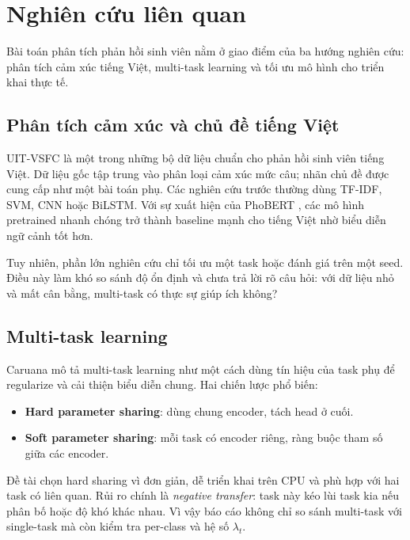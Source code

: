\documentclass[12pt,a4paper]{report}
\begin{document}
\section{Nghiên cứu liên quan}

Bài toán phân tích phản hồi sinh viên nằm ở giao điểm của ba hướng nghiên cứu: phân tích cảm xúc tiếng Việt, multi-task learning và tối ưu mô hình cho triển khai thực tế.

\subsection{Phân tích cảm xúc và chủ đề tiếng Việt}

UIT-VSFC \cite{uitvsfc} là một trong những bộ dữ liệu chuẩn cho phản hồi sinh viên tiếng Việt. Dữ liệu gốc tập trung vào phân loại cảm xúc mức câu; nhãn chủ đề được cung cấp như một bài toán phụ. Các nghiên cứu trước thường dùng TF-IDF, SVM, CNN hoặc BiLSTM. Với sự xuất hiện của PhoBERT \cite{phobert}, các mô hình pretrained nhanh chóng trở thành baseline mạnh cho tiếng Việt nhờ biểu diễn ngữ cảnh tốt hơn.

Tuy nhiên, phần lớn nghiên cứu chỉ tối ưu một task hoặc đánh giá trên một seed. Điều này làm khó so sánh độ ổn định và chưa trả lời rõ câu hỏi: với dữ liệu nhỏ và mất cân bằng, multi-task có thực sự giúp ích không?

\subsection{Multi-task learning}

Caruana \cite{mtl} mô tả multi-task learning như một cách dùng tín hiệu của task phụ để regularize và cải thiện biểu diễn chung. Hai chiến lược phổ biến:

\begin{itemize}[leftmargin=1.2cm]
  \item \textbf{Hard parameter sharing}: dùng chung encoder, tách head ở cuối.
  \item \textbf{Soft parameter sharing}: mỗi task có encoder riêng, ràng buộc tham số giữa các encoder.
\end{itemize}

Đề tài chọn hard sharing vì đơn giản, dễ triển khai trên CPU và phù hợp với hai task có liên quan. Rủi ro chính là \emph{negative transfer}: task này kéo lùi task kia nếu phân bố hoặc độ khó khác nhau. Vì vậy báo cáo không chỉ so sánh multi-task với single-task mà còn kiểm tra per-class và hệ số \(\lambda_t\).
\end{document}
